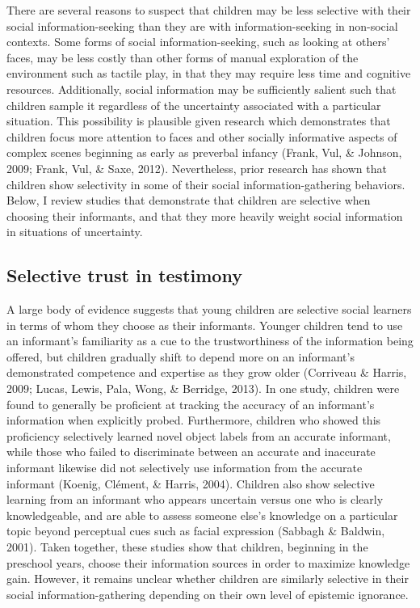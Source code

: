 \documentclass[,man,floatsintext]{apa6}
\begin{document}
There are several reasons to suspect that children may be less selective with their social information-seeking than they are with information-seeking in non-social contexts. Some forms of social information-seeking, such as looking at others' faces, may be less costly than other forms of manual exploration of the environment such as tactile play, in that they may require less time and cognitive resources. Additionally, social information may be sufficiently salient such that children sample it regardless of the uncertainty associated with a particular situation. This possibility is plausible given research which demonstrates that children focus more attention to faces and other socially informative aspects of complex scenes beginning as early as preverbal infancy (Frank, Vul, \& Johnson, 2009; Frank, Vul, \& Saxe, 2012). Nevertheless, prior research has shown that children show selectivity in some of their social information-gathering behaviors. Below, I review studies that demonstrate that children are selective when choosing their informants, and that they more heavily weight social information in situations of uncertainty.

\hypertarget{selective-trust-in-testimony}{%
\subsection{Selective trust in testimony}\label{selective-trust-in-testimony}}

A large body of evidence suggests that young children are selective social learners in terms of whom they choose as their informants. Younger children tend to use an informant's familiarity as a cue to the trustworthiness of the information being offered, but children gradually shift to depend more on an informant's demonstrated competence and expertise as they grow older (Corriveau \& Harris, 2009; Lucas, Lewis, Pala, Wong, \& Berridge, 2013). In one study, children were found to generally be proficient at tracking the accuracy of an informant's information when explicitly probed. Furthermore, children who showed this proficiency selectively learned novel object labels from an accurate informant, while those who failed to discriminate between an accurate and inaccurate informant likewise did not selectively use information from the accurate informant (Koenig, Clément, \& Harris, 2004). Children also show selective learning from an informant who appears uncertain versus one who is clearly knowledgeable, and are able to assess someone else's knowledge on a particular topic beyond perceptual cues such as facial expression (Sabbagh \& Baldwin, 2001). Taken together, these studies show that children, beginning in the preschool years, choose their information sources in order to maximize knowledge gain. However, it remains unclear whether children are similarly selective in their social information-gathering depending on their own level of epistemic ignorance.
\end{document}
